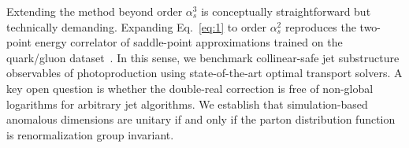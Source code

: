 Extending the method beyond order $\alpha_s^3$ is conceptually
straightforward but technically demanding. Expanding Eq.~\eqref{eq:1} to
order $\alpha_s^2$ reproduces the two-point energy correlator of
saddle-point approximations trained on the quark/gluon
dataset~\cite{TPC:1239-A-Primer-on-Shower-Histories-for-B-Tagging-September-20-2026}.
In this sense, we benchmark collinear-safe jet substructure observables
of photoproduction using state-of-the-art optimal transport solvers. A
key open question is whether the double-real correction is free of
non-global logarithms for arbitrary jet algorithms. We establish that
simulation-based anomalous dimensions are unitary if and only if the
parton distribution function is renormalization group invariant.

